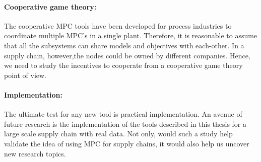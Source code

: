 \paragraph{Cooperative game theory:} The cooperative MPC tools have
been developed for process industries to coordinate multiple MPC's in
a single plant. Therefore, it is reasonable to assume that all the
subsystems can share models and objectives with each-other. In a
supply chain, however,the nodes could
be owned by different companies. Hence, we need to study the incentives to cooperate
from a cooperative game theory point of view. 
\paragraph{Implementation:} The ultimate test for any new tool is
practical implementation. An avenue of future research is the
implementation of the tools described in this thesis for a large scale
supply chain with real data. Not only, would such a study help
validate the idea of using MPC for supply chains, it would also help
us uncover new research topics.

